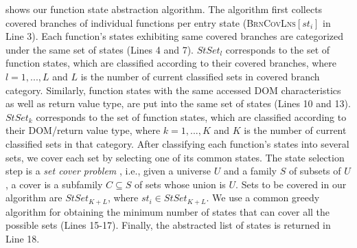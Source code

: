  shows our function state abstraction algorithm. The algorithm first collects covered branches of individual functions per entry state (\textsc{BrnCovLns}$[st_i]$ in Line 3). Each function's states exhibiting same covered branches are categorized under the same set of states (Lines 4 and 7). $StSet_{l}$ corresponds to the set of function states, which are classified according to their covered branches, where $l={1,...,L}$ and $L$ is the number of current classified sets in covered branch category. Similarly, function states with the same accessed DOM characteristics as well as return value type, are put into the same set of states (Lines 10 and 13). $StSet_{k}$ corresponds to the set of function states, which are classified according to their DOM/return value type, where $k={1,...,K}$ and $K$ is the number of current classified sets in that category.  After classifying each function's states into several sets, we cover each set by selecting one of its common states.
The state selection step is a \emph{set cover problem} \cite{Cormen:2001}, i.e., given a universe $U$ and a family $S$ of subsets of $U$, a cover is a subfamily $C \subseteq S$ of sets whose union is $U$.
Sets to be covered in our algorithm are $StSet_{K+L}$, where $st_i \in StSet_{K+L}$. We use a common greedy algorithm for obtaining the minimum number of states that can cover all the possible sets (Lines 15-17). 
Finally, the abstracted list of states is returned in Line 18.          
 
 

  
     
